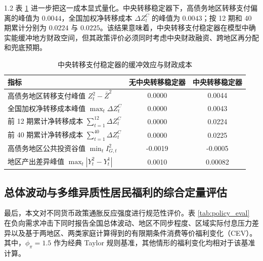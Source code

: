 \documentclass[12pt,UTF8]{ctexart}
\begin{document}
\begin{spacing}{1.2}
		表 \ref{tab:central_transfer_cost} 进一步把这一成本显式量化。中央转移稳定器下，高债务地区转移支付偏离的峰值为 $0.0044$，全国加权净转移成本 $\Delta Z_t^C$ 的峰值为 $0.0043$；按 12 期和 40 期累计分别为 $0.0224$ 与 $0.0225$。该结果意味着，中央转移支付稳定器在模型中确实能缓冲地方财政空间，但其政策评价必须同时考虑中央财政融资、跨地区再分配和兜底预期。

		\begin{table}[H]
			\centering
			\caption{中央转移支付稳定器的缓冲效应与财政成本}
			\label{tab:central_transfer_cost}
			\small
			\begin{tabular}{lcc}
				\toprule
				\textbf{指标} & \textbf{无中央转移稳定器} & \textbf{中央转移稳定器} \\
				\midrule
				高债务地区转移支付峰值 $Z_t^2-\bar Z^2$ & 0.0000 & 0.0044 \\
				全国加权净转移成本峰值 $\max_t \Delta Z_t^C$ & 0.0000 & 0.0043 \\
				前 12 期累计净转移成本 $\sum_{t=1}^{12}\Delta Z_t^C$ & 0.0000 & 0.0224 \\
				前 40 期累计净转移成本 $\sum_{t=1}^{40}\Delta Z_t^C$ & 0.0000 & 0.0225 \\
				高债务地区公共投资谷值 $\min_t I_{G,t}^2$ & -0.0019 & -0.0005 \\
				地区产出差异峰值 $\max_t |Y_t^2-Y_t^1|$ & 0.0010 & 0.00082 \\
				\bottomrule
			\end{tabular}
		\end{table}
		
		\subsection{总体波动与多维异质性居民福利的综合定量评估}
		
		最后，本文对不同货币政策通胀反应强度进行规范性评价。表 \ref{tab:policy_eval} 在负向需求冲击下同时报告全国总体波动、地区不同步程度、区域实际付息压力差异以及基于两地区、两类家庭计算得到的有限期条件消费等价福利变化（CEV）。其中，$\phi_\pi=1.5$ 作为经典 Taylor 规则基准，其他情形的福利变化均相对于该基准计算。


\end{spacing}
\end{document}
